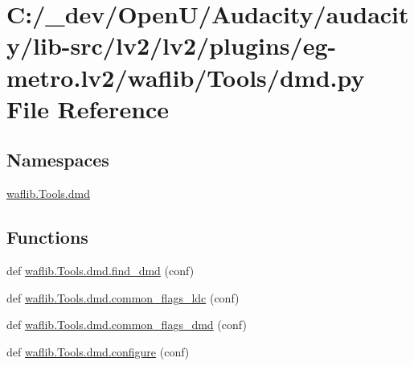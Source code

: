 \hypertarget{lv2_2plugins_2eg-metro_8lv2_2waflib_2_tools_2dmd_8py}{}\section{C\+:/\+\_\+dev/\+Open\+U/\+Audacity/audacity/lib-\/src/lv2/lv2/plugins/eg-\/metro.lv2/waflib/\+Tools/dmd.py File Reference}
\label{lv2_2plugins_2eg-metro_8lv2_2waflib_2_tools_2dmd_8py}
\subsection*{Namespaces}
\begin{DoxyCompactItemize}
\item 
 \hyperlink{namespacewaflib_1_1_tools_1_1dmd}{waflib.\+Tools.\+dmd}
\end{DoxyCompactItemize}
\subsection*{Functions}
\begin{DoxyCompactItemize}
\item 
def \hyperlink{namespacewaflib_1_1_tools_1_1dmd_a4325581bb5714f5478adf1c1c00ca3cd}{waflib.\+Tools.\+dmd.\+find\+\_\+dmd} (conf)
\item 
def \hyperlink{namespacewaflib_1_1_tools_1_1dmd_a491ac92b35c587c124f8738a31c30cd9}{waflib.\+Tools.\+dmd.\+common\+\_\+flags\+\_\+ldc} (conf)
\item 
def \hyperlink{namespacewaflib_1_1_tools_1_1dmd_a418d35f6869615d32f9b91891f3d1d7c}{waflib.\+Tools.\+dmd.\+common\+\_\+flags\+\_\+dmd} (conf)
\item 
def \hyperlink{namespacewaflib_1_1_tools_1_1dmd_a9ba96fbd5fe75ddd056e372285afa6e9}{waflib.\+Tools.\+dmd.\+configure} (conf)
\end{DoxyCompactItemize}
